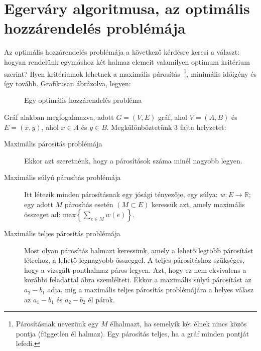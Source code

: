 \section{Egerváry algoritmusa, az optimális hozzárendelés problémája}

Az optimális hozzárendelés problémája a következő kérdésre keresi a választ:
hogyan rendelünk egymáshoz két halmaz elemeit valamilyen optimum kritérium
szerint? Ilyen kritériumok lehetnek a maximális párosítás~\footnote{ Párosításnak
nevezünk egy $M$ élhalmazt, ha semelyik két élnek nincs közös pontja (független
él halmaz). Egy párosítás teljes, ha a gráf minden pontját lefedi.}, minimális
időigény és így tovább. Grafikusan ábrázolva, legyen:

\begin{figure}[ht]
\caption{Egy optimális hozzárendelés probléma}
\label{fig:OptHozProb}
\centering {} 
\end{figure}

Gráf alakban megfogalmazva, adott $G=(V, E)$ gráf, ahol $V=(A, B)$ és $E=(x,y)$,
ahol $x \in A$ és $ y \in B$. Megkülönböztetünk $3$ fajta helyzetet:
\begin{description}
  \item[Maximális párosítás problémája] Ekkor azt szeretnénk, hogy a párosítások
  száma minél nagyobb legyen.
  \item[Maximális súlyú párosítás problémája] Itt létezik minden párosításnak
  egy jósági tényezője, egy súlya: $w:E\rightarrow\mathbb{R}$; egy adott $M$
  párosítás esetén $(M\subset E)$ keressük azt, amely maximális összeget ad:
  $\mbox{max}\left\{\sum_{e\in M}{w(e)}\right\}$.
  \item[Maximális teljes párosítás problémája] Most olyan párosítás halmazt
  keressünk, amely a lehető legtöbb párosítást létrehoz, a lehető legnagyobb
  összeggel. A teljes párositáshoz szükséges, hogy a vizsgált ponthalmaz páros
  legyen. Azt, hogy ez nem ekvivalens a korábbi feladattal
   ábra szemlélteti. Ekkor a maximális súlyú párosítást
  az $a_2-b_1$ adja, míg a maximális teljes párosítás problémájára a helyes
  válasz az $a_1-b_1$ és $a_2-b_2$ él párok.
\end{description}

